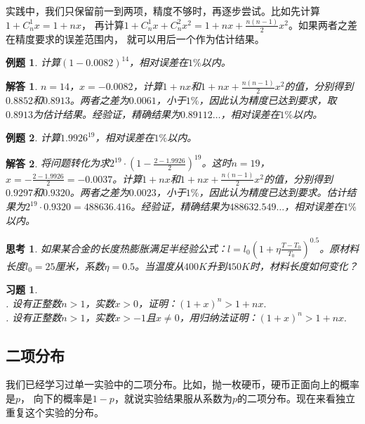 \documentclass[12pt,UTF8]{ctexbook}
\newtheorem{et}{例题}[section]
\newtheorem{sk}{思考}[section]
\newtheorem*{so}{解答}
\newtheorem{xt}{习题}[section]
\begin{document}
实践中，我们只保留前一到两项，精度不够时，再逐步尝试。比如先计算$1 + C_n^1x = 1 + nx$，
再计算$1 + C_n^1x + C_n^2x^2 = 1 + nx + \frac{n(n-1)}{2}x^2$。如果两者之差在精度要求的误差范围内，
就可以用后一个作为估计结果。
\begin{et}
    计算$(1 - 0.0082)^{14}$，相对误差在$1\%$以内。
\end{et}
\begin{so}
    $n=14$，$x=-0.0082$，计算$1 + nx$和$1 + nx + \frac{n(n-1)}{2}x^2$的值，分别得到$0.8852$和$0.8913$。两者之差为$0.0061$，小于$1\%$，因此认为精度已达到要求，取$0.8913$为估计结果。经验证，精确结果为$0.89112\dots$，相对误差在$1\%$以内。
\end{so}
\begin{et}
    计算$1.9926^{19}$，相对误差在$1\%$以内。
\end{et}
\begin{so}
    将问题转化为求$2^{19}\cdot(1-\frac{2-1.9926}{2})^{19}$。这时$n=19$，$x = -\frac{2-1.9926}{2} = -0.0037$。计算$1 + nx$和$1 + nx + \frac{n(n-1)}{2}x^2$的值，分别得到$0.9297$和$0.9320$。两者之差为$0.0023$，小于$1\%$，因此认为精度已达到要求。估计结果为$2^{19}\cdot 0.9320=488636.416$。经验证，精确结果为$488632.549\dots$，相对误差在$1\%$以内。
\end{so}

\begin{sk}
    如果某合金的长度热膨胀满足半经验公式：$l = l_0(1+\eta\frac{T-T_0}{T_0})^{0.5}$。原材料长度$l_0=25$厘米，系数$\eta=0.5$。当温度从$400K$升到$450K$时，材料长度如何变化？
\end{sk}

\begin{xt}
    \mbox{} \\
    . 设有正整数$n > 1$，实数$x > 0$，证明：$(1 + x)^n > 1 + nx.$\\
    . 设有正整数$n > 1$，实数$x > -1$且$x \neq 0$，用归纳法证明：$(1 + x)^n > 1 + nx.$
\end{xt}

\subsection{二项分布}

我们已经学习过单一实验中的二项分布。比如，抛一枚硬币，硬币正面向上的概率是$p$，
向下的概率是$1-p$，就说实验结果服从系数为$p$的二项分布。现在来看独立重复这个实验的分布。
\end{document}
